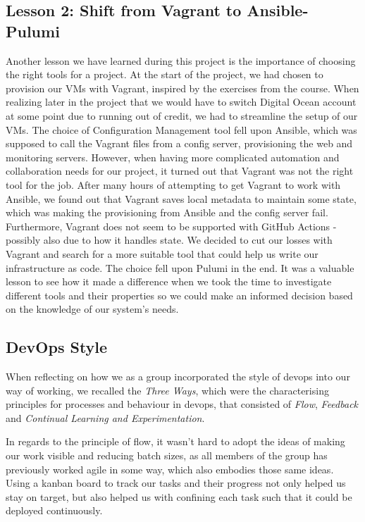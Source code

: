 \subsection{Lesson 2: Shift from Vagrant to Ansible-Pulumi}
Another lesson we have learned during this project is the importance of choosing the right tools for a project.
At the start of the project, we had chosen to provision our VMs with Vagrant, inspired by the exercises from the course.
When realizing later in the project that we would have to switch Digital Ocean account at some point due to running out of credit, we had to streamline the setup of our VMs.
The choice of Configuration Management tool fell upon Ansible, which was supposed to call the Vagrant files from a config server, provisioning the web and monitoring servers.
However, when having more complicated automation and collaboration needs for our project, it turned out that Vagrant was not the right tool for the job.
After many hours of attempting to get Vagrant to work with Ansible, we found out that Vagrant saves local metadata to maintain some state, which was making the provisioning from Ansible and the config server fail\cite{issue178-vagrant-ansible}. Furthermore, Vagrant does not seem to be supported with GitHub Actions - possibly also due to how it handles state.
We decided to cut our losses with Vagrant and search for a more suitable tool that could help us write our infrastructure as code.
The choice fell upon Pulumi in the end.
It was a valuable lesson to see how it made a difference when we took the time to investigate different tools and their properties so we could make an informed decision based on the knowledge of our system's needs.

\subsection{DevOps Style}
When reflecting on how we as a group incorporated the style of devops into our way of working, we recalled the \textit{Three Ways}, which were the characterising principles for processes and behaviour in devops, that consisted of \textit{Flow}, \textit{Feedback} and \textit{Continual Learning and Experimentation}\cite{devopshandbook}.

In regards to the principle of flow, it wasn't hard to adopt the ideas of making our work visible and reducing batch sizes, as all members of the group has previously worked agile in some way, which also embodies those same ideas. Using a kanban board to track our tasks and their progress not only helped us stay on target, but also helped us with confining each task such that it could be deployed continuously\cite{devopshandbook}.

